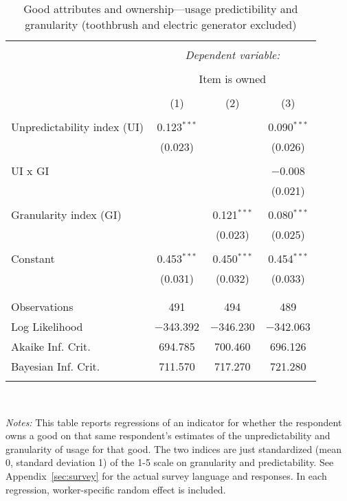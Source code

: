 
\begin{table}[!htbp] \centering 
  \caption{Good attributes and ownership---usage predictibility and granularity (toothbrush and electric generator excluded)} 
  \label{tab:ownership_attr} 
\begin{tabular}{@{\extracolsep{5pt}}lccc} 
\\[-1.8ex]\hline 
\hline \\[-1.8ex] 
 & \multicolumn{3}{c}{\textit{Dependent variable:}} \\ 
\cline{2-4} 
\\[-1.8ex] & \multicolumn{3}{c}{Item is owned} \\ 
\\[-1.8ex] & (1) & (2) & (3)\\ 
\hline \\[-1.8ex] 
 Unpredictability index (UI) & 0.123$^{***}$ &  & 0.090$^{***}$ \\ 
  & (0.023) &  & (0.026) \\ 
  & & & \\ 
 UI x GI &  &  & $-$0.008 \\ 
  &  &  & (0.021) \\ 
  & & & \\ 
 Granularity index (GI) &  & 0.121$^{***}$ & 0.080$^{***}$ \\ 
  &  & (0.023) & (0.025) \\ 
  & & & \\ 
 Constant & 0.453$^{***}$ & 0.450$^{***}$ & 0.454$^{***}$ \\ 
  & (0.031) & (0.032) & (0.033) \\ 
  & & & \\ 
\hline \\[-1.8ex] 
Observations & 491 & 494 & 489 \\ 
Log Likelihood & $-$343.392 & $-$346.230 & $-$342.063 \\ 
Akaike Inf. Crit. & 694.785 & 700.460 & 696.126 \\ 
Bayesian Inf. Crit. & 711.570 & 717.270 & 721.280 \\ 
\hline 
\hline \\[-1.8ex] 
\end{tabular}
\\ {\footnotesize  \begin{minipage}{0.75 \linewidth} \emph{Notes:} This table reports regressions of an indicator for whether the respondent owns a good on that same respondent's estimates of the unpredictability and granularity of usage for that good.
The two indices are just standardized (mean 0, standard deviation 1) of the 1-5 scale on granularity and predictability.
See Appendix~\ref{sec:survey} for the actual survey language and responses.
In each regression, worker-specific random effect is included. 
\end{minipage} }
\end{table}
